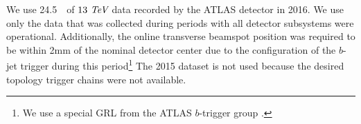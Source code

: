 We use 24.5~\ifb~of $13~\textit{TeV}{}$ data recorded by the ATLAS detector in
2016. We use only the data that was collected during periods with all
detector subsystems were operational.  Additionally, the online transverse
beamspot position was required to be within 2mm of the nominal detector
center  due to the configuration of the $b$-jet trigger during this
period\footnote{
We use a special GRL from the ATLAS $b$-trigger group
.}
The 2015 dataset is not used because the desired topology trigger chains were not available.
